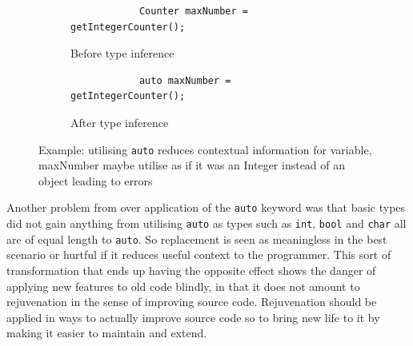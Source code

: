 \documentclass[bsc,frontabs,singlespacing,twoside,parskip,deptreport]{infthesis}
\begin{document}
\begin{figure}[H]
    \centering

    \begin{subfigure}[h]{\textwidth}
        \centering
        \begin{verbatim}
            Counter maxNumber = getIntegerCounter();
        \end{verbatim}
        \caption{Before type inference}
        \label{fig:type-context-before}
        \vspace{0.40cm}
    \end{subfigure}
    
    \begin{subfigure}[h]{\textwidth}
        \begin{verbatim}
            auto maxNumber = getIntegerCounter();
        \end{verbatim}
        \caption{After type inference }
        \centering
        \label{fig:type-context-after}
    \end{subfigure}

    \caption{Example: utilising \texttt{auto} reduces contextual information for variable, maxNumber maybe utilise as if it was an Integer instead of an object leading to errors}
    \label{fig:reduce-info-auto}
\end{figure}


Another problem from over application of the \texttt{auto} keyword was that basic types did not gain anything from utilising \texttt{auto} as types such as \texttt{int}, \texttt{bool} and \texttt{char} all are of equal length to \texttt{auto}. So replacement is seen as meaningless in the best scenario or hurtful if it reduces useful context to the programmer. This sort of transformation that ends up having the opposite effect shows the danger of applying new features to old code blindly, in that it does not amount to rejuvenation in the sense of improving source code. Rejuvenation should be applied in ways to actually improve source code so to bring new life to it by making it easier to maintain and extend. 
\end{document}

